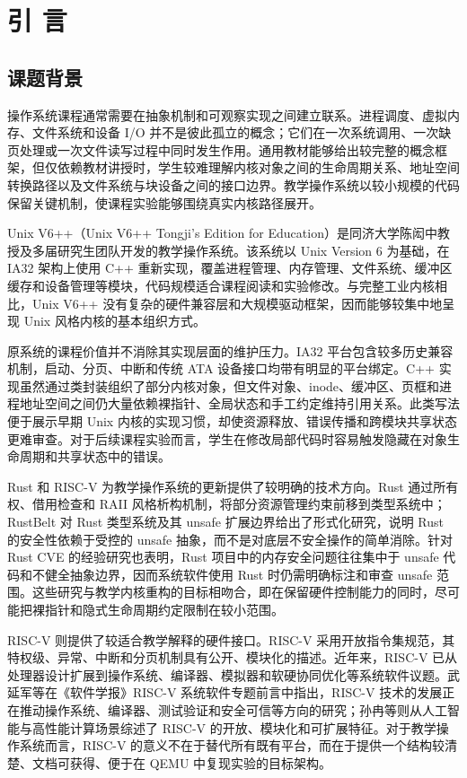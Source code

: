 \chapter{引 言}

\section{课题背景}

操作系统课程通常需要在抽象机制和可观察实现之间建立联系。进程调度、虚拟内存、文件系统和设备 I/O 并不是彼此孤立的概念；它们在一次系统调用、一次缺页处理或一次文件读写过程中同时发生作用。通用教材能够给出较完整的概念框架\cite{tanenbaum2017modern,you1985unix}，但仅依赖教材讲授时，学生较难理解内核对象之间的生命周期关系、地址空间转换路径以及文件系统与块设备之间的接口边界。教学操作系统以较小规模的代码保留关键机制，使课程实验能够围绕真实内核路径展开。

Unix V6++（Unix V6++ Tongji's Edition for Education）是同济大学陈闳中教授及多届研究生团队开发的教学操作系统。该系统以 Unix Version 6 为基础，在 IA32 架构上使用 C++ 重新实现，覆盖进程管理、内存管理、文件系统、缓冲区缓存和设备管理等模块，代码规模适合课程阅读和实验修改\cite{chen2013unixv6pp}。与完整工业内核相比，Unix V6++ 没有复杂的硬件兼容层和大规模驱动框架，因而能够较集中地呈现 Unix 风格内核的基本组织方式。

原系统的课程价值并不消除其实现层面的维护压力。IA32 平台包含较多历史兼容机制，启动、分页、中断和传统 ATA 设备接口均带有明显的平台绑定。C++ 实现虽然通过类封装组织了部分内核对象，但文件对象、inode、缓冲区、页框和进程地址空间之间仍大量依赖裸指针、全局状态和手工约定维持引用关系。此类写法便于展示早期 Unix 内核的实现习惯，却使资源释放、错误传播和跨模块共享状态更难审查。对于后续课程实验而言，学生在修改局部代码时容易触发隐藏在对象生命周期和共享状态中的错误。

Rust 和 RISC-V 为教学操作系统的更新提供了较明确的技术方向。Rust 通过所有权、借用检查和 RAII 风格析构机制，将部分资源管理约束前移到类型系统中\cite{klabnik2022rust}；RustBelt 对 Rust 类型系统及其 unsafe 扩展边界给出了形式化研究，说明 Rust 的安全性依赖于受控的 unsafe 抽象，而不是对底层不安全操作的简单消除\cite{jung2018rustbelt}。针对 Rust CVE 的经验研究也表明，Rust 项目中的内存安全问题往往集中于 unsafe 代码和不健全抽象边界，因而系统软件使用 Rust 时仍需明确标注和审查 unsafe 范围\cite{xu2022memorysafety}。这些研究与教学内核重构的目标相吻合，即在保留硬件控制能力的同时，尽可能把裸指针和隐式生命周期约定限制在较小范围。

RISC-V 则提供了较适合教学解释的硬件接口。RISC-V 采用开放指令集规范，其特权级、异常、中断和分页机制具有公开、模块化的描述\cite{waterman2017riscv,riscv2021privileged}。近年来，RISC-V 已从处理器设计扩展到操作系统、编译器、模拟器和软硬协同优化等系统软件议题。武延军等在《软件学报》RISC-V 系统软件专题前言中指出，RISC-V 技术的发展正在推动操作系统、编译器、测试验证和安全可信等方向的研究\cite{wu2025riscv}；孙冉等则从人工智能与高性能计算场景综述了 RISC-V 的开放、模块化和可扩展特征\cite{sun2026riscv}。对于教学操作系统而言，RISC-V 的意义不在于替代所有既有平台，而在于提供一个结构较清楚、文档可获得、便于在 QEMU 中复现实验的目标架构。


